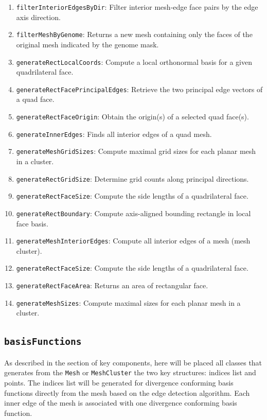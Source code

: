 \documentclass[9pt]{article}
\begin{document}
\begin{enumerate}[label=\Roman*.]
\begin{enumerate}[label=\roman*.]
            \item \texttt{filterInteriorEdgesByDir}: Filter interior mesh‐edge face pairs by the edge axis direction.
            \item \texttt{filterMeshByGenome}: Returns a new mesh containing only the faces of the original mesh indicated by the genome mask.
            \item \texttt{generateRectLocalCoords}: Compute a local orthonormal basis for a given quadrilateral face.
            \item \texttt{generateRectFacePrincipalEdges}: Retrieve the two principal edge vectors of a quad face.
            \item \texttt{generateRectFaceOrigin}: Obtain the origin(s) of a selected quad face(s).
            \item \texttt{generateInnerEdges}: Finds all interior edges of a quad mesh.
            \item \texttt{generateMeshGridSizes}: Compute maximal grid sizes for each planar mesh in a cluster.
            \item \texttt{generateRectGridSize}: Determine grid counts along principal directions.
            \item \texttt{generateRectFaceSize}: Compute the side lengths of a quadrilateral face.
            \item \texttt{generateRectBoundary}: Compute axis-aligned bounding rectangle in local face basis.
            \item \texttt{generateMeshInteriorEdges}: Compute all interior edges of a mesh (mesh cluster).
            \item \texttt{generateRectFaceSize}: Compute the side lengths of a quadrilateral face.
            \item \texttt{generateRectFaceArea}: Returns an area of rectangular face.
            \item \texttt{generateMeshSizes}: Compute maximal sizes for each planar mesh in a cluster.
        \end{enumerate}
    \end{enumerate}

    \subsection{\texttt{basisFunctions}}

    As described in the section of key components, here will be placed all classes that generates from the \texttt{Mesh} or \texttt{MeshCluster} the two key structures: indices list and points. The indices list will be generated for divergence conforming basis functions directly from the mesh based on the edge detection algorithm. Each inner edge of the mesh is associated with one divergence conforming basis function.
\end{document}
